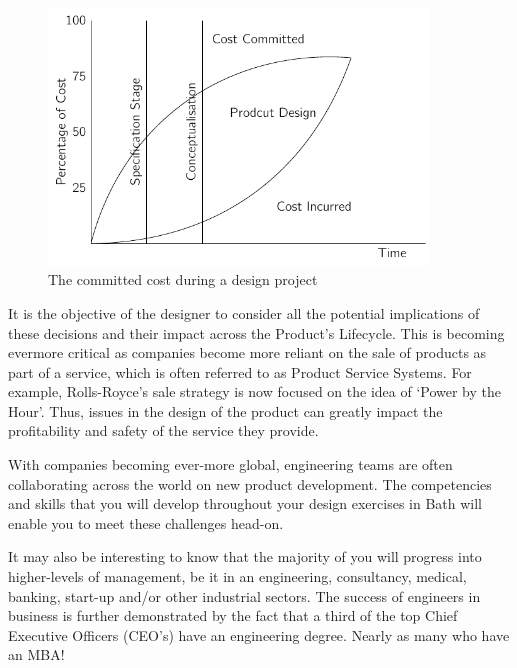 \begin{figure}[t!]
  \centering
  \includegraphics[width=0.9\textwidth]{figs/committed-cost.pdf}
  \caption[The committed cost during a design project]{The committed cost during a design project~\citep{ullman2002}}
  \label{fig-committed}
\end{figure}

It is the objective of the designer to consider all the potential implications of these decisions and their impact across the Product's Lifecycle. This is becoming evermore critical as companies become more reliant on the sale of products as part of a service, which is often referred to as Product Service Systems. For example, Rolls-Royce's sale strategy is now focused on the idea of `Power by the Hour'. Thus, issues in the design of the product can greatly impact the profitability and safety of the service they provide.

With companies becoming ever-more global, engineering teams are often collaborating across the world on new product development. The competencies and skills that you will develop throughout your design exercises in Bath will enable you to meet these challenges head-on.

It may also be interesting to know that the majority of you will progress into higher-levels of management, be it in an engineering, consultancy, medical, banking, start-up and/or other industrial sectors. The success of engineers in business is further demonstrated by the fact that a third of the top Chief Executive Officers (CEO's) have an engineering degree.\cite{bi2011}\cite{hbr2014} Nearly as many who have an MBA! 
